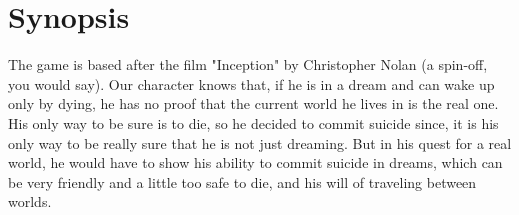 \chapter{Synopsis}

	  The game is based after the film "Inception" by Christopher Nolan (a spin-off, you would say).
	  Our character knows that, if he is in a dream and can wake up only by dying,
	  he has no proof that the current world he lives in is the real one. His only way to be sure is to die,
	  so he decided to commit suicide since, it is his only way to be really sure that he is not just dreaming.
	  But in his quest for a real world, he would have to show his ability to commit suicide in dreams,
	  which can be very friendly and a little too safe to die, and his will of traveling between worlds.